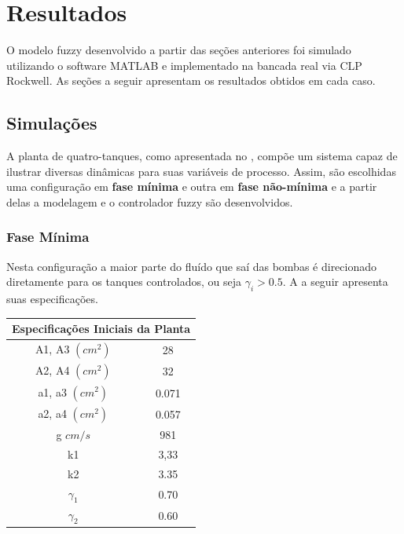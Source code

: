 %

\chapter{Resultados} \label{capRes}

O modelo fuzzy desenvolvido a partir das seções anteriores foi simulado utilizando o software MATLAB \cite{matlab} e implementado na bancada real via CLP Rockwell. As seções a seguir apresentam os resultados obtidos em cada caso.

\section{Simulações} \label{secAnalise}
A planta de quatro-tanques, como apresentada no , compõe um sistema capaz de ilustrar diversas dinâmicas para suas variáveis de processo. Assim, são escolhidas uma configuração em \textbf{fase mínima }e outra em \textbf{fase não-mínima} e a partir delas a modelagem e o controlador fuzzy são desenvolvidos. 

\subsection{Fase Mínima}
Nesta configuração a maior parte do fluído que saí das bombas é direcionado diretamente para os tanques controlados, ou seja $\gamma_i > 0.5$. A  a seguir apresenta suas especificações.

\begin{center} \label{tabFaseMinima}
	\begin{tabular}{|c|c|}
		\hline
		\multicolumn{2}{|c|}{Especificações Iniciais da Planta} \\
		\hline
		A1, A3 $(cm^2)$ & 28 \\ \hline
		A2, A4 $(cm^2)$ & 32 \\ \hline
		a1, a3 $(cm^2)$ & 0.071 \\ \hline
		a2, a4 $(cm^2)$ & 0.057 \\ \hline
		g $cm/s$ & 981 \\ \hline
		k1 & 3,33 \\ \hline
		k2 & 3.35 \\ \hline
		$\gamma_1$ & 0.70 \\ \hline
		$\gamma_2$ & 0.60 \\ \hline
		\hline
	\end{tabular}
\end{center}

